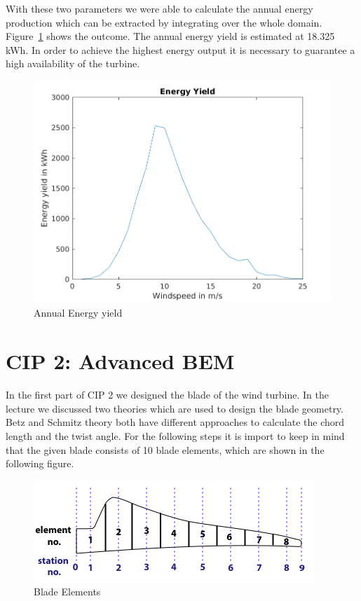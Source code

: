 \documentclass[10pt]{article}
\begin{document}
With these two parameters we were able to calculate the annual energy production which can be extracted by integrating over the whole domain. Figure~\ref{fig:yield} shows the outcome. The annual energy yield is estimated at 18.325 kWh. In order to achieve the highest energy output it is necessary to guarantee a high availability of the turbine. 

\begin{figure}[H]
\includegraphics[width=1\linewidth]{../CIP_1/energy_yield.png}
\caption{Annual Energy yield}
\label{fig:yield}
\end{figure}

\section{CIP 2: Advanced BEM }
In the first part of CIP 2 we designed the blade of the wind turbine. In the lecture we discussed two theories which are used to design the blade geometry. Betz and Schmitz theory both have different approaches to calculate the chord length and the twist angle. For the following steps it is import to keep in mind that the given blade consists of 10 blade elements, which are shown in the following figure.
\begin{figure}[H]
\includegraphics[width=1\linewidth]{../CIP_2/Figures/blade_elements.png}
\caption{Blade Elements}
\label{fig:blade_elemets}
\end{figure}
\end{document}
